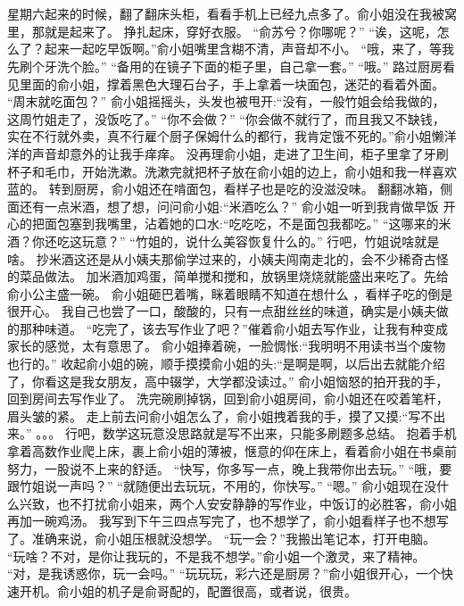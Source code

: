 \chapter{}
星期六起来的时候，翻了翻床头柜，看看手机上已经九点多了。俞小姐没在我被窝里，那就是起来了。
挣扎起床，穿好衣服。
“俞苏兮？你哪呢？”
“诶，这呢，怎么了？起来一起吃早饭啊。”俞小姐嘴里含糊不清，声音却不小。
“哦，来了，等我先刷个牙洗个脸。”
“备用的在镜子下面的柜子里，自己拿一套。”
“哦。”
路过厨房看见里面的俞小姐，撑着黑色大理石台子，手上拿着一块面包，迷茫的看着外面。
“周末就吃面包？”
俞小姐摇摇头，头发也被甩开:“没有，一般竹姐会给我做的，这周竹姐走了，没饭吃了。”
“你不会做？”
“你会做不就行了，而且我又不缺钱，实在不行就外卖，真不行雇个厨子保姆什么的都行，我肯定饿不死的。”俞小姐懒洋洋的声音却意外的让我手痒痒。
没再理俞小姐，走进了卫生间，柜子里拿了牙刷杯子和毛巾，开始洗漱。洗漱完就把杯子放在俞小姐的边上，俞小姐和我一样喜欢蓝的。
转到厨房，俞小姐还在啃面包，看样子也是吃的没滋没味。
翻翻冰箱，侧面还有一点米酒，想了想，问问俞小姐:“米酒吃么？”
俞小姐一听到我肯做早饭 开心的把面包塞到我嘴里，沾着她的口水:“吃吃吃，不是面包我都吃。”
“这哪来的米酒？你还吃这玩意？”
“竹姐的，说什么美容恢复什么的。”
行吧，竹姐说啥就是啥。
抄米酒这还是从小姨夫那偷学过来的，小姨夫闯南走北的，会不少稀奇古怪的菜品做法。
加米酒加鸡蛋，简单搅和搅和，放锅里烧烧就能盛出来吃了。先给俞小公主盛一碗。
俞小姐砸巴着嘴，眯着眼睛不知道在想什么 ，看样子吃的倒是很开心。
我自己也尝了一口，酸酸的，只有一点甜丝丝的味道，确实是小姨夫做的那种味道。
“吃完了，该去写作业了吧？”催着俞小姐去写作业，让我有种变成家长的感觉，太有意思了。
俞小姐捧着碗，一脸惆怅:“我明明不用读书当个废物也行的。”
收起俞小姐的碗，顺手摸摸俞小姐的头:“是啊是啊，以后出去就能介绍了，你看这是我女朋友，高中辍学，大学都没读过。”
俞小姐恼怒的拍开我的手，回到房间去写作业了。
洗完碗刷掉锅，回到俞小姐房间，俞小姐还在咬着笔杆，眉头皱的紧。
走上前去问俞小姐怎么了，俞小姐拽着我的手，摸了又摸:“写不出来。”
。。。
行吧，数学这玩意没思路就是写不出来，只能多刷题多总结。
抱着手机拿着高数作业爬上床，裹上俞小姐的薄被，惬意的仰在床上，看着俞小姐在书桌前努力，一股说不上来的舒适。
“快写，你多写一点，晚上我带你出去玩。”
“哦，要跟竹姐说一声吗？”
“就随便出去玩玩，不用的，你快写。”
“嗯。”
俞小姐现在没什么兴致，也不打扰俞小姐来，两个人安安静静的写作业，中饭订的必胜客，俞小姐再加一碗鸡汤。
我写到下午三四点写完了，也不想学了，俞小姐看样子也不想写了。准确来说，俞小姐压根就没想学。
“玩一会？”我搬出笔记本，打开电脑。
“玩啥？不对，是你让我玩的，不是我不想学。”俞小姐一个激灵，来了精神。
“对，是我诱惑你，玩一会吗。”
“玩玩玩，彩六还是厨房？”俞小姐很开心，一个快速开机。俞小姐的机子是俞哥配的，配置很高，或者说，很贵。
